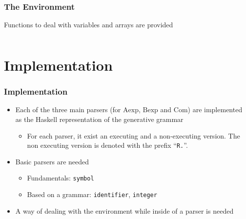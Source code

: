 \documentclass{beamer}
\begin{document}
\begin{frame}
	\frametitle{The Environment}
	\small
	\centerline{Functions to deal with variables and arrays are provided}
	\begin{columns}
		
		
		
		
	\end{columns}
\end{frame}

\section{Implementation}
\begin{frame}
	\frametitle{Implementation}
	\begin{itemize}
		\item Each of the three main parsers (for $\mathrm{Aexp}$, $\mathrm{Bexp}$ and $\mathrm{Com}$) are
			implemented as the Haskell representation of the generative grammar
			\begin{itemize}
				\item For each parser, it exist an executing and a
					non-executing version. The non executing version is denoted
					with the prefix ``\texttt{R.}''.
			\end{itemize}
		\item Basic parsers are needed
		\begin{itemize}
			\item Fundamentals: \texttt{symbol}
			\item Based on a grammar: \texttt{identifier}, \texttt{integer}
		\end{itemize}
		\item A way of dealing with the environment while inside of a parser is needed
	\end{itemize}
\end{frame}
\end{document}
